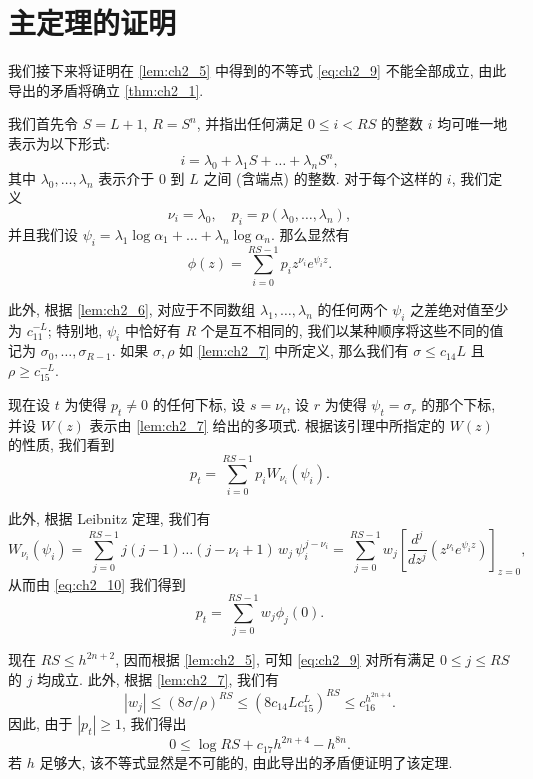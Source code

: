 \section{主定理的证明}

我们接下来将证明在 \autoref{lem:ch2_5} 中得到的不等式 \eqref{eq:ch2_9} 不能全部成立, 由此导出的矛盾将确立 \autoref{thm:ch2_1}.

我们首先令 $S = L + 1$, $R = S^n$, 并指出任何满足 $0 \le i < RS$ 的整数 $i$ 均可唯一地表示为以下形式:
\[
i = \lambda_0 + \lambda_1 S + \dots + \lambda_n S^n,
\]
其中 $\lambda_0, \dots, \lambda_n$ 表示介于 $0$ 到 $L$ 之间 (含端点) 的整数. 对于每个这样的 $i$, 我们定义
\[
\nu_i = \lambda_0, \quad p_i = p(\lambda_0, \dots, \lambda_n),
\]
并且我们设 $\psi_i = \lambda_1 \log \alpha_1 + \dots + \lambda_n \log \alpha_n$.
那么显然有
\begin{equation} \label{eq:ch2_10}\tag{10}
\phi(z) = \sum_{i=0}^{RS-1} p_i z^{\nu_i} e^{\psi_i z}.
\end{equation}

此外, 根据 \autoref{lem:ch2_6}, 对应于不同数组 $\lambda_1, \dots, \lambda_n$ 的任何两个 $\psi_i$ 之差绝对值至少为 $c_{11}^{-L}$; 特别地, $\psi_i$ 中恰好有 $R$ 个是互不相同的, 我们以某种顺序将这些不同的值记为 $\sigma_0, \dots, \sigma_{R-1}$. 如果 $\sigma, \rho$ 如 \autoref{lem:ch2_7} 中所定义, 那么我们有 $\sigma \le c_{14} L$ 且 $\rho \ge c_{15}^{-L}$.

现在设 $t$ 为使得 $p_t \neq 0$ 的任何下标, 设 $s = \nu_t$, 设 $r$ 为使得 $\psi_t = \sigma_r$ 的那个下标, 并设 $W(z)$ 表示由 \autoref{lem:ch2_7} 给出的多项式. 根据该引理中所指定的 $W(z)$ 的性质, 我们看到
\[
p_t = \sum_{i=0}^{RS-1} p_i W_{\nu_i}(\psi_i).
\]

此外, 根据 Leibnitz 定理, 我们有
\[
W_{\nu_i}(\psi_i) = \sum_{j=0}^{RS-1} j(j-1) \dots (j-\nu_i+1) \, w_j \, \psi_i^{j-\nu_i} = \sum_{j=0}^{RS-1} w_j \left[ \frac{d^j}{dz^j} (z^{\nu_i} e^{\psi_i z}) \right]_{z=0},
\]
从而由 \eqref{eq:ch2_10} 我们得到
\[
p_t = \sum_{j=0}^{RS-1} w_j \phi_j(0).
\]

现在 $RS \le h^{2n+2}$, 因而根据 \autoref{lem:ch2_5}, 可知 \eqref{eq:ch2_9} 对所有满足 $0 \le j \le RS$ 的 $j$ 均成立. 此外, 根据 \autoref{lem:ch2_7}, 我们有
\[
|w_j| \le (8\sigma/\rho)^{RS} \le (8c_{14}Lc_{15}^L)^{RS} \le c_{16}^{h^{2n+4}}.
\]
因此, 由于 $|p_t| \ge 1$, 我们得出
\[
0 \le \log RS + c_{17}h^{2n+4} - h^{8n}.
\]
若 $h$ 足够大, 该不等式显然是不可能的, 由此导出的矛盾便证明了该定理.
